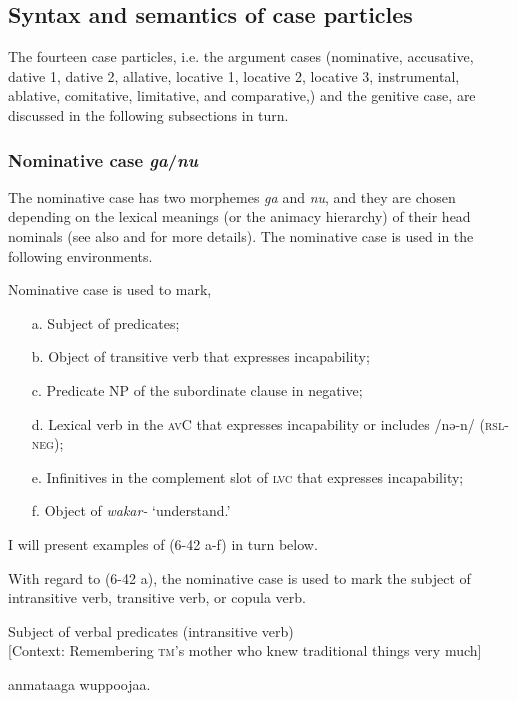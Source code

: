 \subsection{Syntax and semantics of case particles}

The fourteen case particles, i.e. the argument cases (nominative, accusative, dative 1, dative 2, allative, locative 1, locative 2, locative 3, instrumental, ablative, comitative, limitative, and comparative,) and the genitive case, are discussed in the following subsections in turn.

\subsubsection{Nominative case \textit{ga}/\textit{nu}}
\label{bkm:Ref366360662}
The nominative case has two morphemes \textit{ga} and \textit{nu}, and they are chosen depending on the lexical meanings (or the animacy hierarchy) of their head nominals (see also  and  for more details). The nominative case is used in the following environments.

\ea\label{ex:6-42}
 Nominative case is used to mark,\\

 \begin{itemize}
\item[a.]   Subject of predicates;
\item[b.] Object of transitive verb that expresses incapability;
\item[c.] Predicate NP of the subordinate clause in negative;
\item[d.] Lexical verb in the \textsc{av}C that expresses incapability or includes /nə-n/ (\textsc{rsl}-\textsc{neg});
\item[e.] Infinitives in the complement slot of \textsc{lvc} that expresses incapability;
\item[f.] Object of \textit{wakar-} ‘understand.’
\end{itemize}
I will present examples of (6-42 a-f) in turn below.

With regard to (6-42 a), the nominative case is used to mark the subject of intransitive verb, transitive verb, or copula verb.

\ea\label{ex:6-43}
\ea Subject of verbal predicates (intransitive verb)\\{}
[Context: Remembering \textsc{tm}’s mother who knew traditional things very much]

{\TM}
\gll anmataaga  wuppoojaa.

